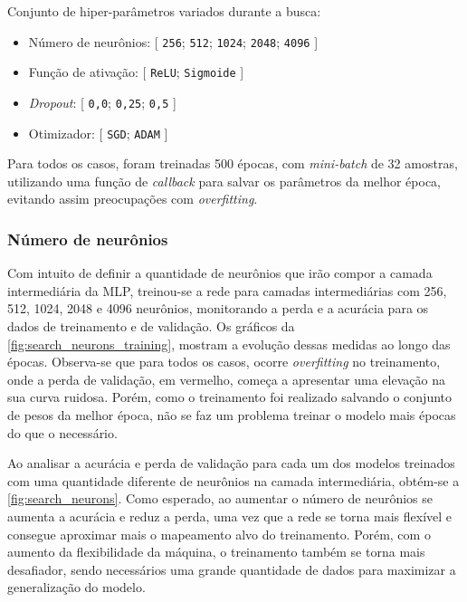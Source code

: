 Conjunto de hiper-parâmetros variados durante a busca:


\begin{itemize}
	\item Número de neurônios: [ \texttt{256}; \texttt{512}; \texttt{1024}; \texttt{2048}; \texttt{4096} ]
	\item Função de ativação: [ \texttt{ReLU}; \texttt{Sigmoide} ]
	\item \textit{Dropout}: [ \texttt{0,0}; \texttt{0,25}; \texttt{0,5} ]
	\item Otimizador: [ \texttt{SGD}; \texttt{ADAM} ]
\end{itemize} 

Para todos os casos, foram treinadas 500 épocas, com \textit{mini-batch} de 32 amostras, utilizando uma função de \textit{callback} para salvar os parâmetros da melhor época, evitando assim preocupações com \textit{overfitting}.

\subsubsection{Número de neurônios}

Com intuito de definir a quantidade de neurônios que irão compor a camada intermediária da MLP, treinou-se a rede para camadas intermediárias com 256, 512, 1024, 2048 e 4096 neurônios, monitorando a perda e a acurácia para os dados de treinamento e de validação. Os gráficos da \autoref{fig:search_neurons_training}, mostram a evolução dessas medidas ao longo das épocas. Observa-se que para todos os casos, ocorre \textit{overfitting} no treinamento, onde a perda de validação, em vermelho, começa a apresentar uma elevação na sua curva ruidosa. Porém, como o treinamento foi realizado salvando o conjunto de pesos da melhor época, não se faz um problema treinar o modelo mais épocas do que o necessário.



Ao analisar a acurácia e perda de validação para cada um dos modelos treinados com uma quantidade diferente de neurônios na camada intermediária, obtém-se a \autoref{fig:search_neurons}. Como esperado, ao aumentar o número de neurônios se aumenta a acurácia e reduz a perda, uma vez que a rede se torna mais flexível e consegue aproximar mais o mapeamento alvo do treinamento. Porém, com o aumento da flexibilidade da máquina, o treinamento também se torna mais desafiador, sendo necessários uma grande quantidade de dados para maximizar a generalização do modelo.

